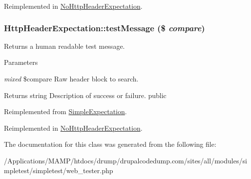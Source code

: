 Reimplemented in \hyperlink{class_no_http_header_expectation_a3eeb88677fbcc6f33f719aec17d93013}{NoHttpHeaderExpectation}.\hypertarget{class_http_header_expectation_ac564586fb079247c33a04e6ead31f8cb}{
\subsubsection[{testMessage}]{\setlength{\rightskip}{0pt plus 5cm}HttpHeaderExpectation::testMessage (\$ {\em compare})}}
\label{class_http_header_expectation_ac564586fb079247c33a04e6ead31f8cb}
Returns a human readable test message. 
\begin{DoxyParams}{Parameters}
\item[{\em mixed}]\$compare Raw header block to search. \end{DoxyParams}
\begin{DoxyReturn}{Returns}
string Description of success or failure.  public 
\end{DoxyReturn}


Reimplemented from \hyperlink{class_simple_expectation_a15b69edf659c76f6543aa98d8d85b025}{SimpleExpectation}.

Reimplemented in \hyperlink{class_no_http_header_expectation_a5fcd01471616efc71a8e28d2e8380ccb}{NoHttpHeaderExpectation}.

The documentation for this class was generated from the following file:\begin{DoxyCompactItemize}
\item 
/Applications/MAMP/htdocs/drump/drupalcodedump.com/sites/all/modules/simpletest/simpletest/web\_\-tester.php\end{DoxyCompactItemize}
